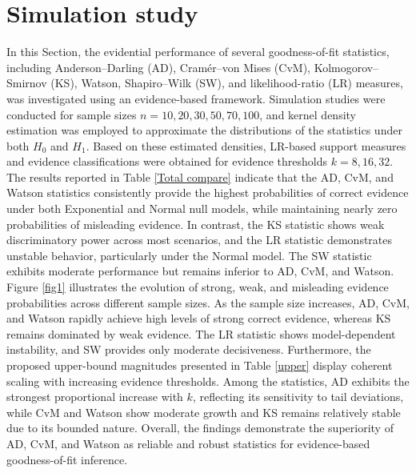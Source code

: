 \documentclass[twoside]{article}
\begin{document}
\section{Simulation study}
In this ُSection, the evidential performance of several goodness-of-fit statistics, including Anderson–Darling (AD), Cramér–von Mises (CvM), Kolmogorov–Smirnov (KS), Watson, Shapiro–Wilk (SW), and likelihood-ratio (LR) measures, was investigated using an evidence-based framework. Simulation studies were conducted for sample sizes \(n=10,20,30,50,70,100\), and kernel density estimation was employed to approximate the distributions of the statistics under both \(H_0\) and \(H_1\). Based on these estimated densities, LR-based support measures and evidence classifications were obtained for evidence thresholds \(k=8,16,32\).
The results reported in Table \ref{Total compare} indicate that the AD, CvM, and Watson statistics consistently provide the highest probabilities of correct evidence under both Exponential and Normal null models, while maintaining nearly zero probabilities of misleading evidence. In contrast, the KS statistic shows weak discriminatory power across most scenarios, and the LR statistic demonstrates unstable behavior, particularly under the Normal model. The SW statistic exhibits moderate performance but remains inferior to AD, CvM, and Watson.
Figure \ref{fig1} illustrates the evolution of strong, weak, and misleading evidence probabilities across different sample sizes. As the sample size increases, AD, CvM, and Watson rapidly achieve high levels of strong correct evidence, whereas KS remains dominated by weak evidence. The LR statistic shows model-dependent instability, and SW provides only moderate decisiveness.
Furthermore, the proposed upper-bound magnitudes presented in Table \ref{upper} display coherent scaling with increasing evidence thresholds. Among the statistics, AD exhibits the strongest proportional increase with \(k\), reflecting its sensitivity to tail deviations, while CvM and Watson show moderate growth and KS remains relatively stable due to its bounded nature. Overall, the findings demonstrate the superiority of AD, CvM, and Watson as reliable and robust statistics for evidence-based goodness-of-fit inference.
\end{document}
